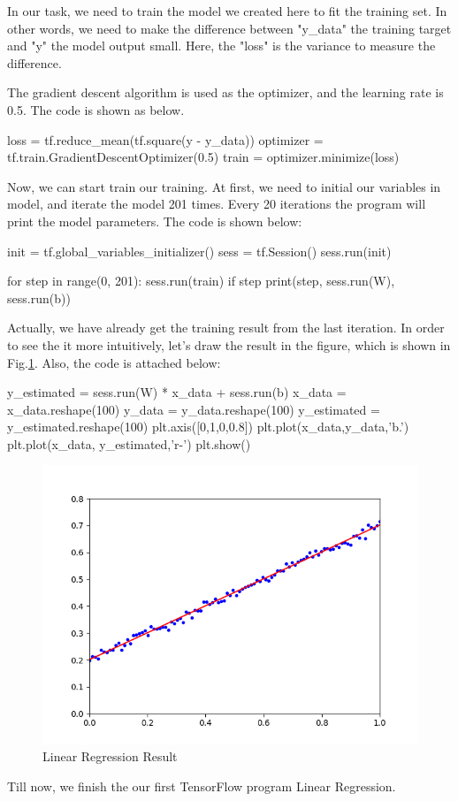 \documentclass[12pt,letterpaper]{article}
\begin{document}
 	In our task, we need to train the model we created here to fit the training set. In other words, we need to make the difference between "y\_data" {\textemdash} the training target  and "y" {\textemdash} the model output small. Here, the "loss" is the variance to measure the difference. \par
 	The gradient descent algorithm is used as the optimizer, and the learning rate is 0.5. The code is shown as below.
 	\begin{python}
 		loss = tf.reduce_mean(tf.square(y - y_data))
 		optimizer = tf.train.GradientDescentOptimizer(0.5)
 		train = optimizer.minimize(loss)
 	\end{python}
 
 	Now, we can start train our training. At first, we need to initial our variables in model, and iterate the model 201 times. Every 20 iterations the program will print the model parameters. The code is shown below: \newpage
 	\begin{python}
 	init = tf.global_variables_initializer()
 	sess = tf.Session()
 	sess.run(init)
 	
 	for step in range(0, 201):
 			sess.run(train)
 			if step %
 					print(step, sess.run(W), sess.run(b))
 	\end{python}
 	
	Actually, we have already get the training result from the last iteration. In order to see the it more intuitively, let's draw the result in the figure, which is shown in Fig.\ref{Fig:FigResult}. Also, the code is attached below:
	
	\begin{python}
		y_estimated = sess.run(W) * x_data + sess.run(b)
		x_data = x_data.reshape(100)
		y_data = y_data.reshape(100)
		y_estimated = y_estimated.reshape(100)
		plt.axis([0,1,0,0.8])
		plt.plot(x_data,y_data,'b.')
		plt.plot(x_data, y_estimated,'r-')
		plt.show()
	\end{python} 
		\begin{figure}[http]
		\centering
		\includegraphics[scale=0.65]{./FigResult.png}
		\caption{\label{Fig:FigResult}Linear Regression Result}
	\end{figure}

	Till now, we finish the our first TensorFlow program {\textemdash} Linear Regression.
\end{document}
